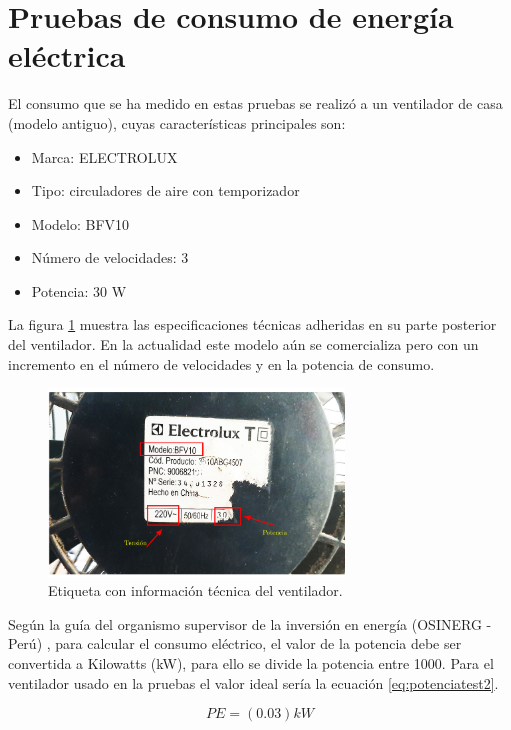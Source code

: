 \section{Pruebas de consumo de energía eléctrica}

El consumo que se ha medido en estas pruebas se realizó a un ventilador de casa (modelo antiguo), cuyas características principales son:

\begin{itemize}
\item Marca: ELECTROLUX
\item Tipo:	circuladores de aire con temporizador
\item Modelo: BFV10
\item Número de velocidades: 3
\item Potencia: 30 W
\end{itemize}

La figura \ref{fig:ventilador}  muestra las especificaciones técnicas adheridas en su parte posterior del ventilador. En la actualidad este modelo aún se comercializa pero con un incremento en el número de velocidades y en la potencia de consumo. 

\begin{figure}[htpb]
\centering 
\includegraphics[width=0.7\textwidth]{./Figures/test/consumo/ventilador.png}
\caption{Etiqueta con información técnica del ventilador.}
\label{fig:ventilador}
\end{figure}

Según la guía del organismo supervisor de la inversión en energía (OSINERG - Perú) \citep{BOOK:3}, para calcular el consumo eléctrico, el valor de la potencia  debe ser convertida a Kilowatts (kW), para ello se divide la potencia entre 1000. Para el ventilador usado en la pruebas el valor ideal sería la ecuación \ref{eq:potenciatest2}.

\begin{equation}
	\label{eq:potenciatest2}
	PE = \left( 0.03 \right) kW
\end{equation}

